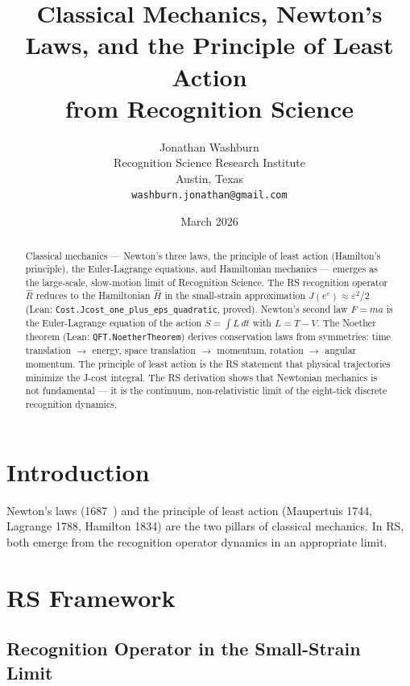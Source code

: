 \documentclass[12pt,a4paper]{article}
\title{Classical Mechanics, Newton's Laws, and the Principle of Least Action\\
from Recognition Science}
\author{Jonathan Washburn\\
Recognition Science Research Institute\\
Austin, Texas\\
\texttt{washburn.jonathan@gmail.com}}
\date{March 2026}
\theoremstyle{definition}
\theoremstyle{remark}
\begin{document}
\maketitle

\begin{abstract}
Classical mechanics --- Newton's three laws, the principle of least action
(Hamilton's principle), the Euler-Lagrange equations, and Hamiltonian
mechanics --- emerges as the large-scale, slow-motion limit of Recognition
Science.  The RS recognition operator $\hat{R}$ reduces to the Hamiltonian
$\hat{H}$ in the small-strain approximation $J(e^\varepsilon) \approx
\varepsilon^2/2$ (Lean: \texttt{Cost.Jcost\_one\_plus\_eps\_quadratic},
proved).  Newton's second law $F = ma$ is the Euler-Lagrange equation of
the action $S = \int L\,dt$ with $L = T - V$.  The Noether theorem
(Lean: \texttt{QFT.NoetherTheorem}) derives conservation laws from
symmetries: time translation $\to$ energy, space translation $\to$
momentum, rotation $\to$ angular momentum.  The principle of least action
is the RS statement that physical trajectories minimize the J-cost integral.
The RS derivation shows that Newtonian mechanics is not fundamental —
it is the continuum, non-relativistic limit of the eight-tick discrete
recognition dynamics.
\end{abstract}

\section{Introduction}

Newton's laws (1687~\cite{Newton1687}) and the principle of least action
(Maupertuis 1744, Lagrange 1788, Hamilton 1834) are the two pillars of
classical mechanics.  In RS, both emerge from the recognition operator
dynamics in an appropriate limit.

\section{RS Framework}

\subsection{Recognition Operator in the Small-Strain Limit}
\end{document}
